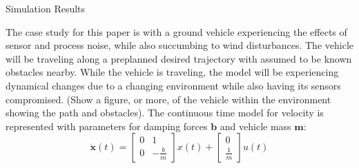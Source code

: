 
\begin{section}{Simulation Results}
\label{sec:simulation}

The case study for this paper is with a ground vehicle experiencing the effects of sensor and process noise, while also succumbing to wind disturbances. The vehicle will be traveling along a preplanned desired trajectory with assumed to be known obstacles nearby. While the vehicle is traveling, the model will be experiencing dynamical changes due to a changing environment while also having its sensors compromised. (Show a figure, or more, of the vehicle within the environment showing the path and obstacles). The continuous time model for velocity is represented with parameters for damping forces $\bm{b}$ and vehicle mass $\bm{m}$:
\begin{equation}
\bm{\dot{x}}(t) = \begin{bmatrix} 0 & 1 \\
  0 & -\frac{b}{m} \end{bmatrix}x(t) + \begin{bmatrix} 0  \\  \frac{1}{m} \end{bmatrix}u(t)
\end{equation}



\end{section}